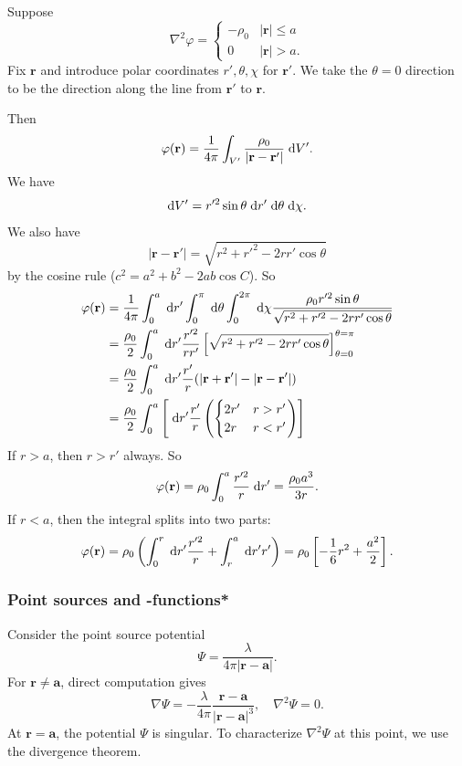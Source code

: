 \documentclass[a4paper]{article}
\begin{document}
\begin{eg}
  Suppose
  \[
    \nabla^2 \varphi =
    \begin{cases}
      -\rho_0 & |\mathbf{r}| \leq a\\
      0 & |\mathbf{r}| > a.
    \end{cases}
  \]
  Fix $\mathbf{r}$ and introduce polar coordinates $r', \theta, \chi$ for $\mathbf{r}'$. We take the $\theta = 0$ direction to be the direction along the line from $\mathbf{r}'$ to $\mathbf{r}$.

  Then
  \[
    \varphi(\mathbf{r}) = \frac{1}{4\pi}\int_{V'}\frac{\rho_0}{|\mathbf{r} - \mathbf{r}'|}\;\mathrm{d} V'.
  \]
  We have
  \[
    \mathrm{d} V' = r'^2 \sin \theta\;\mathrm{d} r'\;\mathrm{d} \theta\;\mathrm{d} \chi.
  \]
  We also have
  \[
    |\mathbf{r} - \mathbf{r}'| = \sqrt{r^2 + r'^2 - 2rr'\cos \theta}
  \]
  by the cosine rule ($c^2 = a^2 + b^2 - 2ab\cos C$). So
  \begin{align*}
    \varphi(\mathbf{r}) &= \frac{1}{4\pi}\int_0^a \;\mathrm{d} r'\int_0^\pi \;\mathrm{d} \theta \int_0^{2\pi}\;\mathrm{d} \chi \frac{\rho_0 r'^2 \sin \theta}{\sqrt{r^2 + r'^2 - 2rr'\cos \theta}}\\
    &= \frac{\rho_0}{2}\int_0^a \;\mathrm{d} r' \frac{r'^2}{rr'}\left[\sqrt{r^2 + r'^2 - 2rr'\cos \theta}\right]^{\theta = \pi}_{\theta = 0}\\
    &= \frac{\rho_0}{2}\int_0^a \;\mathrm{d} r' \frac{r'}{r}(|\mathbf{r} + \mathbf{r}'| - |\mathbf{r} - \mathbf{r}'|)\\
    &= \frac{\rho_0}{2}\int_0^a\left[ \;\mathrm{d} r' \frac{r'}{r}\left(
      \begin{cases}
        2r' & r > r'\\
        2r & r < r'
    \end{cases}\right)\right]
  \end{align*}
  If $r > a$, then $r > r'$ always. So
  \[
    \varphi(\mathbf{r}) = \rho_0 \int_0^a \frac{r'^2}{r}\;\mathrm{d} r' = \frac{\rho_0 a^3}{3r}.
  \]
  If $r < a$, then the integral splits into two parts:
  \[
    \varphi(\mathbf{r}) = \rho_0\left(\int_0^r \;\mathrm{d} r' \frac{r'^2}{r} + \int_r^a \;\mathrm{d} r' r'\right) = \rho_0\left[-\frac{1}{6}r^2 + \frac{a^2}{2}\right].
  \]
\end{eg}

\subsubsection{Point sources and -functions*}
Consider the point source potential
\[
  \Psi = \frac{\lambda}{4\pi |\mathbf{r} - \mathbf{a}|}.
\]
For $\mathbf{r} \neq \mathbf{a}$, direct computation gives
\[
  \nabla \Psi = -\frac{\lambda}{4\pi}\frac{\mathbf{r} - \mathbf{a}}{|\mathbf{r} - \mathbf{a}|^3},\quad\nabla^2\Psi = 0.
\]
At $\mathbf{r} = \mathbf{a}$, the potential $\Psi$ is singular. To characterize $\nabla^2 \Psi$ at this point, we use the divergence theorem.
\end{document}
